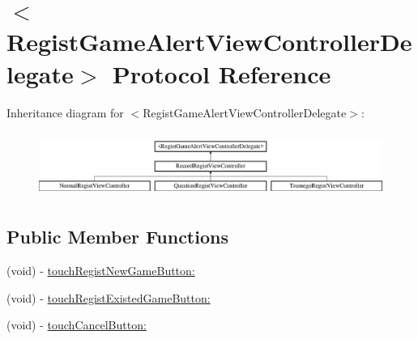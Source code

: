 \hypertarget{protocol_regist_game_alert_view_controller_delegate-p}{
\section{$<$RegistGameAlertViewControllerDelegate$>$ Protocol Reference}
\label{protocol_regist_game_alert_view_controller_delegate-p}
}
Inheritance diagram for $<$RegistGameAlertViewControllerDelegate$>$:\begin{figure}[H]
\begin{center}
\leavevmode
\includegraphics[height=2.145594cm]{protocol_regist_game_alert_view_controller_delegate-p}
\end{center}
\end{figure}
\subsection*{Public Member Functions}
\begin{DoxyCompactItemize}
\item 
(void) -\/ \hyperlink{protocol_regist_game_alert_view_controller_delegate-p_a55537864c487cfca4cee00d23c3413ff}{touchRegistNewGameButton:}
\item 
(void) -\/ \hyperlink{protocol_regist_game_alert_view_controller_delegate-p_af32bb0bbe85ec3de2cb30cc7c756e962}{touchRegistExistedGameButton:}
\item 
(void) -\/ \hyperlink{protocol_regist_game_alert_view_controller_delegate-p_a3d1357098fb3eac9f2834bc2221daeab}{touchCancelButton:}
\end{DoxyCompactItemize}


